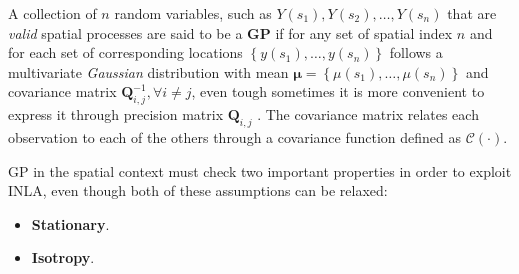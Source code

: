 \documentclass[
  12pt,
  a4paper,
  oneside]{book}
\providecommand{\tightlist}{%
  \setlength{\itemsep}{0pt}\setlength{\parskip}{0pt}}
\begin{document}
A collection of \(n\) random variables, such as \(Y(s_{1}), Y(s_{2}) , \ldots, Y(s_{n})\) that are \emph{valid} spatial processes are said to be a \textbf{GP} if for any set of spatial index \(n\) and for each set of corresponding locations \(\left\{y\left(s_{1}\right), \ldots, y\left(s_{n}\right)\right\}\) follows a multivariate \emph{Gaussian} distribution with mean \(\boldsymbol{\mu}=\left\{\mu\left(s_{1}\right), \ldots, \mu\left(s_{n}\right)\right\}\) and covariance matrix \(\mathbf{Q}^{-1}_{i,j}, \forall i \neq j\), even tough sometimes it is more convenient to express it through precision matrix \(\boldsymbol{Q}_{i,j}\) \citep{Blangiardo-Cameletti}. The covariance matrix relates each observation to each of the others through a covariance function defined as \(\mathcal{C}(\cdot)\).

GP in the spatial context must check two important properties in order to exploit INLA, even though both of these assumptions can be relaxed:

\begin{itemize}
\tightlist
\item
  \textbf{Stationary}.
\item
  \textbf{Isotropy}.
\end{itemize}
\end{document}
